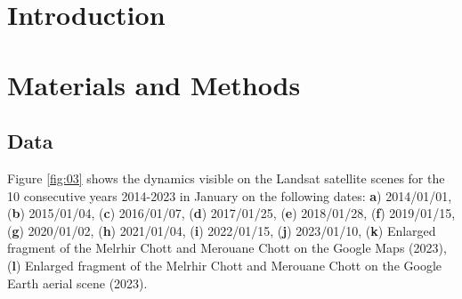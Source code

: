 \documentclass[knowledge,article,submit,pdftex,moreauthors]{Definitions/mdpi}
\begin{document}
\section{Introduction}

\section{Materials and Methods}

\pagebreak
\subsection{Data}

Figure \ref{fig:03} shows the dynamics visible on the Landsat satellite scenes for the 10 consecutive years 2014-2023 in January on the following dates: \textbf{a}) 2014/01/01, (\textbf{b}) 2015/01/04, (\textbf{c}) 2016/01/07, (\textbf{d}) 2017/01/25, (\textbf{e}) 2018/01/28, (\textbf{f}) 2019/01/15, (\textbf{g}) 2020/01/02, (\textbf{h}) 2021/01/04, (\textbf{i}) 2022/01/15, (\textbf{j}) 2023/01/10, (\textbf{k}) Enlarged fragment of the Melrhir Chott and Merouane Chott on the Google Maps (2023), (\textbf{l}) Enlarged fragment of the Melrhir Chott and Merouane Chott on the Google Earth aerial scene (2023).
\end{document}
